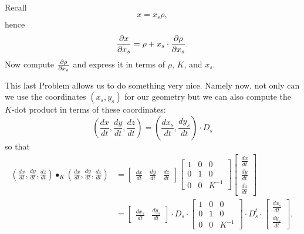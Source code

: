 \documentclass{ximera}
\begin{document}
\begin{hint}
Recall 
\[
x = x_s \rho,
\]
hence 
\[
\pp[x]{x_s} = \rho + x_s\cdot \pp[\rho]{x_s}.
\]
Now compute $\pp[\rho]{x_s}$ and express it in terms of $\rho$, $K$,
and $x_s$.
\end{hint}

This last Problem allows us to do something very nice. Namely now, not
only can we use the coordinates $\left( x_{s},y_{s}\right) $ for our
geometry but we can also compute the $K$-dot product in terms of these
coordinates:%
\[
\left(  \frac{dx}{dt},\frac{dy}{dt},\frac{dz}{dt}\right)  =\left(
\frac{dx_{s}}{dt},\frac{dy_{s}}{dt}\right)  \cdot D_{s}%
\]
so that%
\begin{align*}
\left(  \frac{dx}{dt},\frac{dy}{dt},\frac{dz}{dt}\right)  \bullet_{K}\left(
\frac{dx}{dt},\frac{dy}{dt},\frac{dz}{dt}\right)   &=
\begin{bmatrix}
\frac{dx}{dt} & \frac{dy}{dt} & \frac{dz}{dt}%
\end{bmatrix}
\begin{bmatrix}
1 & 0 & 0\\
0 & 1 & 0\\
0 & 0 & K^{-1}%
\end{bmatrix}
\begin{bmatrix}
\frac{dx}{dt}\\
\frac{dy}{dt}\\
\frac{dz}{dt}%
\end{bmatrix}\\
&=
\begin{bmatrix}
\frac{dx_{s}}{dt} & \frac{dy_{s}}{dt}%
\end{bmatrix}
\cdot D_{s}\cdot
\begin{bmatrix}
1 & 0 & 0\\
0 & 1 & 0\\
0 & 0 & K^{-1}%
\end{bmatrix}
\cdot D_{s}^{t}\cdot
\begin{bmatrix}
\frac{dx_{s}}{dt}\\
\frac{dy_{s}}{dt}%
\end{bmatrix},
\end{align*}
\end{document}
